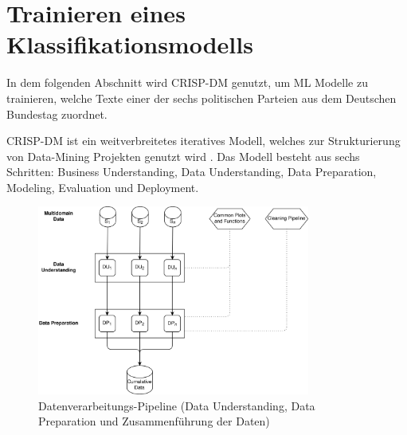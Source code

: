 
\chapter{Trainieren eines Klassifikationsmodells} \label{ch:crispDm_1}



In dem folgenden Abschnitt wird \ac{CRISP-DM} genutzt, um \ac{ML} Modelle zu trainieren, welche Texte einer der sechs politischen Parteien aus dem Deutschen Bundestag zuordnet. 


\ac{CRISP-DM} ist ein weitverbreitetes iteratives Modell, welches zur Strukturierung von Data-Mining Projekten genutzt wird \autocite{martinez-plumed_casp-dm_2017, chapman_crisp-dm_2000}. Das Modell besteht aus sechs Schritten: Business Understanding, Data Understanding, Data Preparation, Modeling, Evaluation und Deployment. 

\begin{figure}[H]
    \centering
    \includegraphics[width=0.8\textwidth]{images/data_flow_v2_1.png}
    \caption[Datenverarbeitungs-Pipeline]{Datenverarbeitungs-Pipeline (Data Understanding, Data Preparation und Zusammenführung der Daten)} \label{fig:dataFlow_1}
\end{figure}


